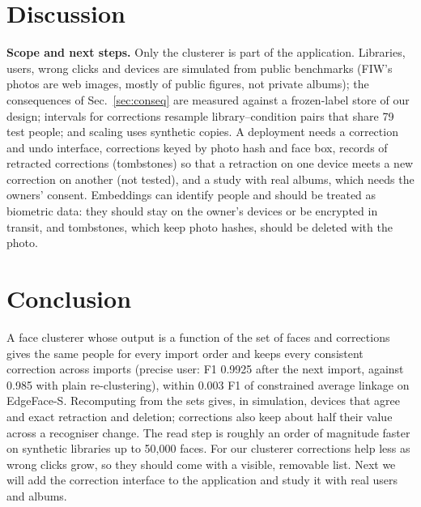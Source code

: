 \documentclass[conference]{IEEEtran}
\begin{document}
\section{Discussion}
\textbf{Scope and next steps.} Only the clusterer is part of the application. Libraries, users, wrong clicks and devices are
simulated from public benchmarks (FIW's photos are web images, mostly of public figures, not private albums); the consequences
of Sec.~\ref{sec:conseq} are measured against a frozen-label store of our design; intervals for corrections resample
library--condition pairs that share 79 test people; and scaling uses synthetic copies. A deployment needs a correction and undo
interface, corrections keyed by photo hash and face box, records of retracted corrections (tombstones) so that a retraction on
one device meets a new correction on another (not tested), and a study with real albums, which needs the owners' consent.
Embeddings can identify people and should be treated as biometric data: they should stay on the owner's devices or be encrypted
in transit, and tombstones, which keep photo hashes, should be deleted with the photo.

\section{Conclusion}
A face clusterer whose output is a function of the set of faces and corrections gives the same people for every import order
and keeps every consistent correction across imports (precise user: F1 0.9925 after the next import, against 0.985 with plain
re-clustering), within 0.003 F1 of constrained average linkage on EdgeFace-S. Recomputing from the sets gives, in simulation,
devices that agree and exact retraction and deletion; corrections also keep about half their value across a recogniser
change. The read step is roughly an order of magnitude faster on synthetic libraries up to 50{,}000 faces. For our clusterer corrections help
less as wrong clicks grow, so they should come with a visible, removable list. Next we will add the correction interface to
the application and study it with real users and albums.
\end{document}
